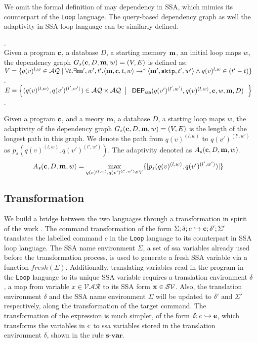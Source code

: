 We omit the formal definition of may dependency in SSA, which mimics its counterpart of the {\tt Loop} language. The query-based dependency graph as well the adaptivity in SSA loop language can be similarly defined.

\begin{defn}
.
\\
Given a program ${\bf{{c}}}$, a database $D$, a starting memory ${\bf{{m}}}$, an initial loop maps $w$, the dependency graph $G_{s}({\bf{{c}}},D,{\bf{{m}}},w) = (V, E)$ is defined as: \\
$V =\{q(v)^{l,w} \in \mathcal{AQ} \mid \forall t. \exists {\bf{{m'}}},  w', t'.  \langle {\bf{{m}}} ,{\bf{{c}}}, t, w \rangle  \to^{*}  \langle {\bf{{m'}}} , \mathtt{skip}, t', w'  \rangle  \land q(v)^{l,w} \in {(t'-t)}  \}$.
\\
$E = \left\{(q(v)^{(l,w)},q(v')^{(l',w')}) \in \mathcal{AQ} \times \mathcal{AQ} 
~ \left \vert ~ \begin{array}{l}
  \mathsf{DEP_{ssa}}(q(v')^{(l',w')},q(v)^{(l,w)}, {\bf{{c}}},w,{\bf{{m}}},D)     
\end{array} \right. 
\right\}$.
\end{defn}


\begin{defn}
Given a program ${\bf{{c}}}$, and a meory ${\bf{{m}}}$, a database $D$, a starting loop maps $w$, the adaptivity of the dependency graph $G_s({\bf{{c}}}, D,{\bf{{m}}},w) = (V, E)$ is the length of the longest path in this graph. We denote the path from $q(v)^{(l,w)}$ to $q(v')^{(l',w')}$ as $p_s(q(v)^{(l,w)}, q(v')^{(l',w')} )$. The adaptivity denoted as $A_s({\bf{{c}}}, D, {\bf{{m}}}, w)$.
%
$$A_s({\bf{{c}}}, D, {\bf{{m}}}, w) = \max\limits_{q(v)^{(l,w)},q(v')^{(l',w')} \in V }\{ |p_s(q(v)^{(l,w)}, q(v')^{(l',w')} )| \}$$
\end{defn}



\subsection{Transformation }
We build a bridge between the two languages through a transformation in spirit of the work \cite{VekrisCJ16}. The command transformation of the form $ \Sigma; \delta ; c  \hookrightarrow {\bf{{c}}} ; \delta' ; \Sigma'$ translates the labelled command $c$ in the {\tt Loop} language to its counterpart in SSA loop language.  The SSA name environment $\Sigma$, a set of ssa variables already used before the transformation process, is used to generate a fresh SSA variable via a function $fresh(\Sigma)$. Additionally, translating variables read in the program in the {\tt Loop} language to its unique SSA variable requires a translation environment $\delta$, a map from variable $x \in \mathcal{VAR}$ to its SSA form ${\bf{{x}}} \in \mathcal{SV}$. Also, the translation environment $\delta$ and the SSA name environment $\Sigma$ will be updated to $\delta'$ and $\Sigma'$ respectively, along the transformation of the target command. The transformation of the expression is much simpler, of the form $ \delta; e \hookrightarrow {\bf{{e}}}$, which transforms the variables in $e$ to ssa variables stored in the translation environment $\delta$, shown in the rule $\textbf{s-var}$.

